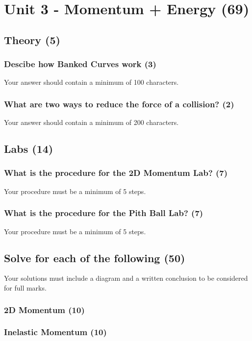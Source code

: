 \documentclass{article}
\begin{document}
\section{Unit 3 - Momentum + Energy (69)}
\subsection{Theory (5)}
\subsubsection{Descibe how Banked Curves work (3)}
Your answer should contain a minimum of 100 characters.

\subsubsection{What are two ways to reduce the force of a collision? (2)}
Your answer should contain a minimum of 200 characters.

\subsection{Labs (14)}
\subsubsection{What is the procedure for the 2D Momentum Lab? (7)}
Your procedure must be a minimum of 5 steps.

\subsubsection{What is the procedure for the Pith Ball Lab? (7)}
Your procedure must be a minimum of 5 steps.

\subsection{Solve for each of the following (50)}
Your solutions must include a diagram and a written conclusion to be considered for full marks.

\subsubsection{2D Momentum (10)}
\subsubsection{Inelastic Momentum (10)}
\end{document}
